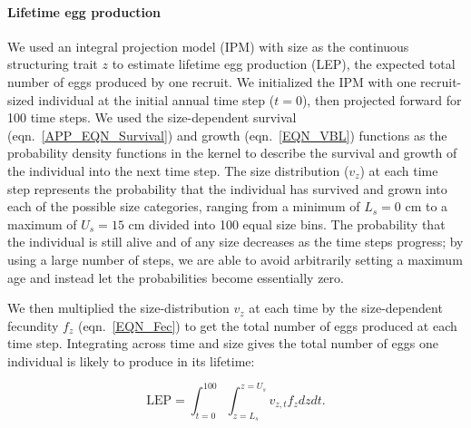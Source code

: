 \documentclass[12pt, oneside]{article}   	%
\begin{document}

\paragraph*{Lifetime egg production}
We used an integral projection model (IPM) \citep{ellner2016data} with size as the continuous structuring trait $z$ to estimate lifetime egg production (LEP), the expected total number of eggs produced by one recruit. We initialized the IPM with one recruit-sized individual at the initial annual time step ($t=0$), then projected forward for 100 time steps. We used the size-dependent survival (eqn.\ \ref{APP_EQN_Survival}) and growth (eqn.\ \ref{EQN_VBL}) functions as the probability density functions in the kernel to describe the survival and growth of the individual into the next time step. The size distribution ($v_z$) at each time step represents the probability that the individual has survived and grown into each of the possible size categories, ranging from a minimum of $L_s=0$ cm to a maximum of $U_s=15$ cm divided into 100 equal size bins. The probability that the individual is still alive and of any size decreases as the time steps progress; by using a large number of steps, we are able to avoid arbitrarily setting a maximum age and instead let the probabilities become essentially zero. %

We then multiplied the size-distribution $v_z$ at each time by the size-dependent fecundity $f_z$ (eqn.\ \ref{EQN_Fec}) to get the total number of eggs produced at each time step. Integrating across time and size gives the total number of eggs one individual is likely to produce in its lifetime:

\begin{equation}
\text{LEP} = \int_{t=0}^{100}\int_{z=L_s}^{z=U_s} v_{z,t} f_z dz dt. \label{EQN_LEP}
\end{equation}
\end{document}
